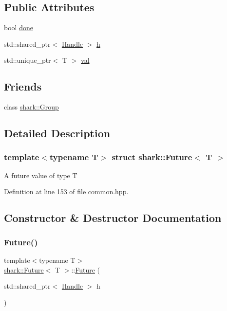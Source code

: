 \subsection*{Public Attributes}
\begin{DoxyCompactItemize}
\item 
bool \hyperlink{structshark_1_1_future_ae873cf93e919c066f04ff337ce3a21e1}{done}
\item 
std\+::shared\+\_\+ptr$<$ \hyperlink{classshark_1_1_handle}{Handle} $>$ \hyperlink{structshark_1_1_future_a54f00db085adbffb18b2e2ab9e3d4b32}{h}
\item 
std\+::unique\+\_\+ptr$<$ T $>$ \hyperlink{structshark_1_1_future_ad47e70b84ce6303568af0bd6aca991da}{val}
\end{DoxyCompactItemize}
\subsection*{Friends}
\begin{DoxyCompactItemize}
\item 
class \hyperlink{structshark_1_1_future_a8e678e0244c103cad9467c2b743509bb}{shark\+::\+Group}
\end{DoxyCompactItemize}


\subsection{Detailed Description}
\subsubsection*{template$<$typename T$>$\newline
struct shark\+::\+Future$<$ T $>$}

A future value of type T 

Definition at line 153 of file common.\+hpp.



\subsection{Constructor \& Destructor Documentation}
\hypertarget{structshark_1_1_future_a92d1efe967edc2466b85ac14062cde61}{}\label{structshark_1_1_future_a92d1efe967edc2466b85ac14062cde61} 
\subsubsection{\texorpdfstring{Future()}{Future()}\hspace{0.1cm}{\footnotesize\ttfamily [1/5]}}
{\footnotesize\ttfamily template$<$typename T$>$ \\
\hyperlink{structshark_1_1_future}{shark\+::\+Future}$<$ T $>$\+::\hyperlink{structshark_1_1_future}{Future} (\begin{DoxyParamCaption}\item[{std\+::shared\+\_\+ptr$<$ \hyperlink{classshark_1_1_handle}{Handle} $>$}]{h }\end{DoxyParamCaption})}

